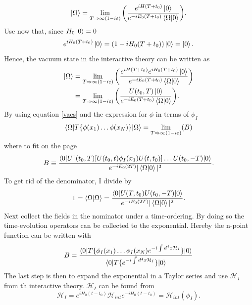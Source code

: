 \begin{equation}
	\ket{\Omega}=\lim\limits_{T\Rightarrow \infty (1-i\varepsilon)}\bigg(\frac{e^{iH(T+t_0)}\ket{0}}{e^{-iE_0(T+t_0)}\braket{\Omega|0}}\bigg).
\end{equation} 
Use now that, since $H_0\ket{0}=0$
\begin{equation}
	e^{iH_0(T+t_0)}\ket{0}=(1-iH_0(T+t_0))\ket{0}=\ket{0}.
\end{equation} 
Hence, the vacuum state in the interactive theory can be written as
\begin{equation}
	\begin{split}
		\ket{\Omega}&=\lim\limits_{T\Rightarrow \infty (1-i\varepsilon)}\bigg(\frac{e^{iH(T+t_0)}e^{iH_0(T+t_0)}\ket{0}}{e^{-iE_0(T+t_0)}\braket{\Omega|0}}\bigg)\\
		&=\lim\limits_{T\Rightarrow \infty (1-i\varepsilon)}\bigg(\frac{U(t_0,T)\ket{0}}{e^{-iE_0(T+t_0)}\braket{\Omega|0}}\bigg).\\
	\end{split}
	\label{vacs}
\end{equation} 
By using equation \eqref{vacs} and the expression for $\phi$ in terms of $\phi_I$
\begin{equation}
	\braket{\Omega|T\{\phi(x_1)\dots \phi(x_N)\}|\Omega}=\lim\limits_{T\Rightarrow \infty (1-i\varepsilon)}(B)
\end{equation} 
where to fit on the page
\begin{equation}
	B\equiv \frac{\braket{0|U^\dagger(t_0,T)[U(t_0,t)\phi_I(x_1)U(t,t_0)]\dots U(t_0,-T)|0}}{e^{-iE_0(2T)}|\braket{\Omega|0}|^2}.
\end{equation}
To get rid of the denominator, I divide by
\begin{equation}
	1=\braket{\Omega|\Omega}=\frac{\braket{0|U(T,t_0)U(t_0,-T)|0}}{e^{-iE_0(2T)}|\braket{\Omega|0}|^2}.
\end{equation} 
Next collect the fields in the nominator under a time-ordering. By doing so the time-evolution operators can be collected to the exponential. Hereby the n-point function can be written with
\begin{equation}
	B = \frac{\braket{0|T\{\phi_I(x_1)\dots\phi_I(x_N)e^{-i\int d^4x \mathcal{H}_I}\}|0}}{\braket{0|T\{e^{-i\int d^4x \mathcal{H}_I}\}|0}}
	\label{pert}
\end{equation} 
The last step is then to expand the exponential in a Taylor series and use $\mathcal{H}_I$ from th interactive theory. $\mathcal{H}_I$ can be found from
\begin{equation}
	\mathcal{H}_I=e^{iH_0(t-t_0)}\mathcal{H}_{int}e^{-iH_0(t-t_0)}=\mathcal{H}_{int}(\phi_I).
\end{equation} 
